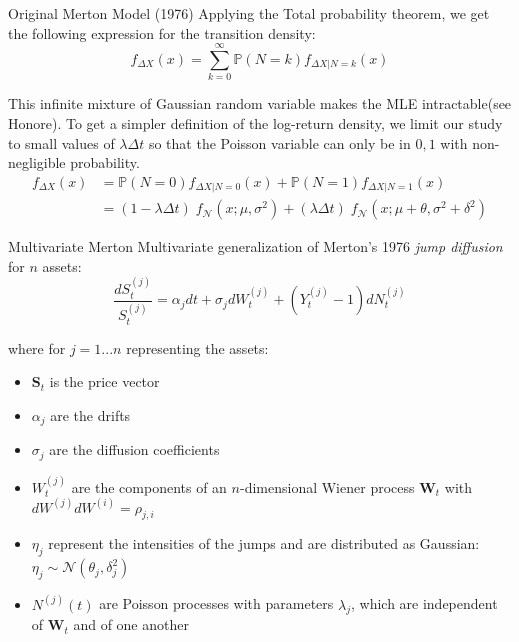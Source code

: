 \documentclass{beamer}
\begin{document}
\begin{frame}{Original Merton Model (1976)}
Applying the Total probability theorem, we get the following expression for the transition density:
\begin{equation}
\label{transitional}
    f_{\Delta X} (x) = \sum_{k=0}^{\infty} \mathbb{P}(N = k) f_{\Delta X | N = k}(x) 
\end{equation}

This infinite mixture of Gaussian random variable makes the MLE intractable(see Honore). %
To get a simpler definition of the log-return density, we limit our study to small values of $\lambda \Delta t$ so that the Poisson variable can only be in ${0,1}$ with non-negligible probability.
\begin{equation*}
\begin{split}
    f_{\Delta X} (x) & = \mathbb{P}(N = 0) f_{\Delta X | N = 0}(x) + \mathbb{P}(N = 1) f_{\Delta X | N = 1}(x)\\
             &= (1 - \lambda \Delta t) \;f_{\mathcal{N}}(x ; \mu, \sigma^2) + (\lambda \Delta t)\; f_{\mathcal{N}}(x ; \mu + \theta, \sigma^2+\delta^2)
\end{split}
\end{equation*}
\end{frame}

\begin{frame}{Multivariate Merton}
Multivariate generalization of Merton's 1976 \textit{jump diffusion} for $n$ assets:
\begin{equation}
\label{merton_prices}
    \frac{dS_t^{(j)}}{S_t^{(j)}} = \alpha_j dt + \sigma_j dW_t^{(j)} + (Y^{(j)}_t -1) dN^{(j)}_t
\end{equation}

where for $j = 1 ... n$ representing the assets:
\begin{itemize}
    \item $\mathbf{S}_t$ is the price vector
    \item $\alpha_j$ are the drifts
    \item $\sigma_j$ are the diffusion coefficients
    \item $W^{(j)}_t$ are the components of an $n$-dimensional Wiener process $ \mathbf{W}_t$ with $dW^{(j)}dW^{(i)}=\rho_{j,i}$
    \item $\eta_j$ represent the intensities of the jumps and are distributed as Gaussian: $\eta_j \sim \mathcal{N}(\theta_j , \delta_j^2)$
    \item $N^{(j)}(t)$ are Poisson processes with parameters $\lambda_j$, which are independent of $\mathbf{W}_t$ and of one another
\end{itemize}

\end{frame}
\end{document}
